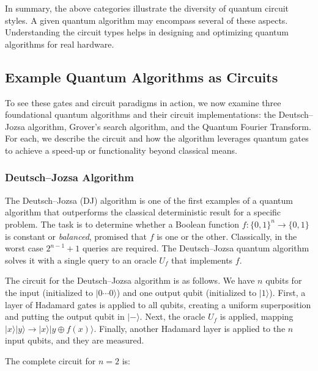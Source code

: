 In summary, the above categories illustrate the diversity of quantum circuit styles. A given quantum algorithm may encompass several of these aspects.\cite{Shor1994} Understanding the circuit types helps in designing and optimizing quantum algorithms for real hardware.\cite{Arute2019supremacy}


\subsection{Example Quantum Algorithms as Circuits}

To see these gates and circuit paradigms in action, we now examine three foundational quantum algorithms and their circuit implementations: the Deutsch–Jozsa algorithm, Grover’s search algorithm, and the Quantum Fourier Transform.\cite{NielsenChuang2010} For each, we describe the circuit and how the algorithm leverages quantum gates to achieve a speed-up or functionality beyond classical means.\cite{Preskill2018nisq}

\subsubsection*{Deutsch–Jozsa Algorithm}

The Deutsch–Jozsa (DJ) algorithm is one of the first examples of a quantum algorithm that outperforms the classical deterministic result for a specific problem.\cite{Deutsch1992rapid} The task is to determine whether a Boolean function $f:\{0,1\}^n \to \{0,1\}$ is constant or \emph{balanced}, promised that $f$ is one or the other.\cite{Deutsch1992rapid} Classically, in the worst case $2^{n-1}+1$ queries are required.\cite{Cleve1998dj} The Deutsch–Jozsa quantum algorithm solves it with a single query to an oracle $U_f$ that implements $f$.\cite{Deutsch1992rapid}

The circuit for the Deutsch–Jozsa algorithm is as follows.\cite{NielsenChuang2010} We have $n$ qubits for the input (initialized to $|0\cdots0\rangle$) and one output qubit (initialized to $|1\rangle$). First, a layer of Hadamard gates is applied to all qubits, creating a uniform superposition and putting the output qubit in $|-\rangle$.\cite{Deutsch1992rapid} Next, the oracle $U_f$ is applied, mapping $|x\rangle|y\rangle\!\to\!|x\rangle|y\oplus f(x)\rangle$.\cite{Cleve1998dj} Finally, another Hadamard layer is applied to the $n$ input qubits, and they are measured.\cite{NielsenChuang2010}

The complete circuit for $n=2$ is:

